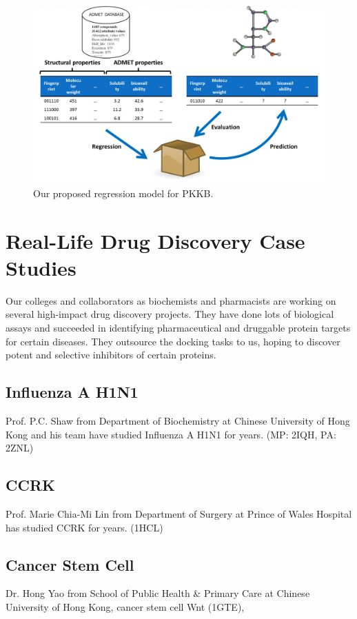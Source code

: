 \begin{figure}
\centering
\includegraphics[width=\linewidth]{PKKB/Regression.png}
\caption{Our proposed regression model for PKKB.}
\label{PKKB:Regression}
\end{figure}

\section{Real-Life Drug Discovery Case Studies}

Our colleges and collaborators as biochemists and pharmacists are working on several high-impact drug discovery projects. They have done lots of biological assays and succeeded in identifying pharmaceutical and druggable protein targets for certain diseases. They outsource the docking tasks to us, hoping to discover potent and selective inhibitors of certain proteins.

\subsection{Influenza A H1N1}

Prof. P.C. Shaw from Department of Biochemistry at Chinese University of Hong Kong and his team have studied Influenza A H1N1 for years.  (MP: 2IQH, PA: 2ZNL)

\subsection{CCRK}

Prof. Marie Chia-Mi Lin from Department of Surgery at Prince of Wales Hospital has studied CCRK for years. (1HCL)

\subsection{Cancer Stem Cell}

Dr. Hong Yao from School of Public Health \& Primary Care at Chinese University of Hong Kong, cancer stem cell Wnt (1GTE), 

\chapterend